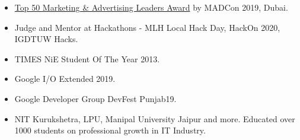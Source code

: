 



\begin{itemize}
    \item  \color{LightGrey} \color{mecol}\href{https://drive.google.com/drive/folders/1W8HZmATotqPVJcRV8dol9LuKinMlSWxu?usp=sharing }{Top 50 Marketing \& Advertising Leaders Award} \color{LightGrey}by MADCon 2019,  Dubai.
    
      \item Judge and Mentor at Hackathons - MLH Local Hack Day, HackOn 2020,  IGDTUW Hacks.
      
      \item  TIMES NiE Student Of The Year 2013.
    
    \end{itemize}
    

\begin{itemize}
      \item  Google I/O Extended 2019. 
    \item   Google Developer Group DevFest Punjab19.
   
    
    \item NIT Kurukshetra, LPU, Manipal University Jaipur and more. Educated over 1000 students on professional growth in IT Industry.  
    
    \end{itemize}

  
  
 \newline 

  \newline
{} \newline
{}  \newline
{}  \newline
{} \newline

